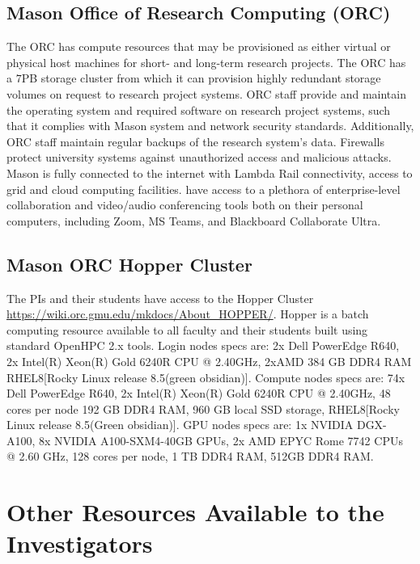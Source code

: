 \documentclass[11pt]{article}
\begin{document}
\subsection*{Mason Office of Research Computing (ORC)} The ORC has compute resources that may be provisioned as either virtual or physical host machines for short- and long-term research projects. The ORC has a $7$PB storage cluster from which it can provision highly redundant storage volumes on request to research project systems. ORC staff provide and maintain the operating system and required software on research project systems, such that it complies with Mason system and network security standards. Additionally, ORC staff maintain regular backups of the research system’s data. Firewalls protect university systems against unauthorized access and malicious attacks. Mason is fully connected to the internet with Lambda Rail connectivity, access to grid and cloud computing facilities. have access to a plethora of enterprise-level collaboration and video/audio conferencing tools both on their personal computers, including Zoom, MS Teams, and Blackboard Collaborate Ultra. 	

\subsection*{Mason ORC Hopper Cluster} The PIs and their students have access to the Hopper Cluster \url{https://wiki.orc.gmu.edu/mkdocs/About_HOPPER/}. Hopper is a batch computing resource available to all faculty and their students built using standard OpenHPC 2.x tools. Login nodes specs are: 2x Dell PowerEdge R640, 2x Intel(R) Xeon(R) Gold 6240R CPU @ 2.40GHz, 2xAMD 384 GB DDR4 RAM RHEL8[Rocky Linux release 8.5(green obsidian)]. Compute nodes specs are: 74x Dell PowerEdge R640,
2x Intel(R) Xeon(R) Gold 6240R CPU @ 2.40GHz, 48 cores per node
192 GB DDR4 RAM, 960 GB local SSD storage, RHEL8[Rocky Linux release 8.5(Green obsidian)]. GPU nodes specs are: 1x NVIDIA DGX-A100, 8x NVIDIA A100-SXM4-40GB GPUs, 2x AMD EPYC Rome 7742 CPUs @ 2.60 GHz, 128 cores per node, 1 TB DDR4 RAM, 512GB DDR4 RAM.

\section*{Other Resources Available to the Investigators}
\end{document}
